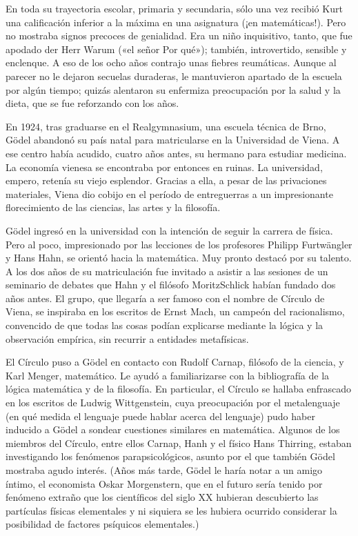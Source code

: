 \documentclass[a4paper, 12pt]{article}
\begin{document}
En toda su trayectoria escolar, primaria y secundaria, sólo una vez recibió Kurt una calificación inferior a la máxima en una asignatura (¡en matemáticas!). Pero no mostraba signos precoces de genialidad. Era un niño inquisitivo, tanto, que fue apodado der Herr Warum («el señor Por qué»); también, introvertido, sensible y enclenque. A eso de los ocho años contrajo unas fiebres reumáticas. Aunque al parecer no le dejaron secuelas duraderas, le mantuvieron apartado de la escuela por algún tiempo; quizás alentaron su enfermiza preocupación por la salud y la dieta, que se fue reforzando con los años.

En 1924, tras graduarse en el Realgymnasium, una escuela técnica de Brno, Gödel abandonó su país natal para matricularse en la Universidad de Viena. A ese centro había acudido, cuatro años antes, su hermano para estudiar medicina. La economía vienesa se encontraba por entonces en ruinas. La universidad, empero, retenía su viejo esplendor. Gracias a ella, a pesar de las privaciones materiales, Viena dio cobijo en el período de entreguerras a un impresionante florecimiento de las ciencias, las artes y la filosofía.

Gödel ingresó en la universidad con la intención de seguir la carrera de física. Pero al poco, impresionado por las lecciones de los profesores Philipp Furtwängler y Hans Hahn, se orientó hacia la matemática. Muy pronto destacó por su talento. A los dos años de su matriculación fue invitado a asistir a las sesiones de un seminario de debates que Hahn y el filósofo Moritz\linebreak Schlick habían fundado dos años antes. El grupo, que llegaría a ser famoso con el nombre de Círculo de Viena, se inspiraba en los escritos de Ernst Mach, un campeón del racionalismo, convencido de que todas las cosas podían explicarse mediante la lógica y la observación empírica, sin recurrir a entidades metafísicas.

El Círculo puso a Gödel en contacto con Rudolf Carnap, filósofo de la ciencia, y Karl Menger, matemático. Le ayudó a familiarizarse con la bibliografía de la lógica matemática y de la filosofía. En particular, el Círculo se hallaba enfrascado en los escritos de Ludwig Wittgenstein, cuya preocupación por el metalenguaje (en qué medida el lenguaje puede hablar acerca del lenguaje) pudo haber inducido a Gödel a sondear cuestiones similares en matemática. Algunos de los miembros del Círculo, entre ellos Carnap, Hanh y el físico Hans Thirring, estaban investigando los fenómenos parapsicológicos, asunto por el que también Gödel mostraba agudo interés. (Años más tarde, Gödel le haría notar a un amigo íntimo, el economista Oskar Morgenstern, que en el futuro sería tenido por fenómeno extraño que los científicos del siglo XX hubieran descubierto las partículas físicas elementales y ni siquiera se les hubiera ocurrido considerar la posibilidad de factores psíquicos elementales.)
\end{document}
